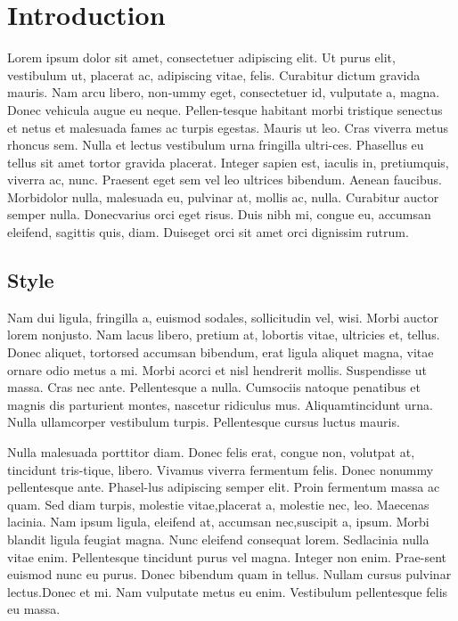 \documentclass[a4paper,11pt]{texMemo}
\begin{document}
\maketitle
\section*{Introduction}
Lorem ipsum dolor sit amet, consectetuer adipiscing elit. Ut purus elit, vestibulum ut, placerat ac, adipiscing vitae, felis. Curabitur dictum gravida mauris. Nam arcu libero, non-ummy eget, consectetuer id, vulputate a, magna. Donec vehicula augue eu neque. Pellen-tesque habitant morbi tristique senectus et netus et malesuada fames ac turpis egestas. Mauris ut leo. Cras viverra metus rhoncus sem. Nulla et lectus vestibulum urna fringilla ultri-ces. Phasellus eu tellus sit amet tortor gravida placerat. Integer sapien est, iaculis in, pretiumquis, viverra ac, nunc. Praesent eget sem vel leo ultrices bibendum. Aenean faucibus. Morbidolor nulla, malesuada eu, pulvinar at, mollis ac, nulla. Curabitur auctor semper nulla. Donecvarius orci eget risus. Duis nibh mi, congue eu, accumsan eleifend, sagittis quis, diam. Duiseget orci sit amet orci dignissim rutrum.

\subsection*{Style}
Nam dui ligula, fringilla a, euismod sodales, sollicitudin vel, wisi. Morbi auctor lorem nonjusto. Nam lacus libero, pretium at, lobortis vitae, ultricies et, tellus. Donec aliquet, tortorsed accumsan bibendum, erat ligula aliquet magna, vitae ornare odio metus a mi. Morbi acorci et nisl hendrerit mollis. Suspendisse ut massa. Cras nec ante. Pellentesque a nulla. Cumsociis natoque penatibus et magnis dis parturient montes, nascetur ridiculus mus. Aliquamtincidunt urna. Nulla ullamcorper vestibulum turpis. Pellentesque cursus luctus mauris.

Nulla malesuada porttitor diam. Donec felis erat, congue non, volutpat at, tincidunt tris-tique, libero. Vivamus viverra fermentum felis. Donec nonummy pellentesque ante. Phasel-lus adipiscing semper elit. Proin fermentum massa ac quam. Sed diam turpis, molestie vitae,placerat a, molestie nec, leo. Maecenas lacinia. Nam ipsum ligula, eleifend at, accumsan nec,suscipit a, ipsum. Morbi blandit ligula feugiat magna. Nunc eleifend consequat lorem. Sedlacinia nulla vitae enim. Pellentesque tincidunt purus vel magna. Integer non enim. Prae-sent euismod nunc eu purus. Donec bibendum quam in tellus. Nullam cursus pulvinar lectus.Donec et mi. Nam vulputate metus eu enim. Vestibulum pellentesque felis eu massa.
\end{document}
